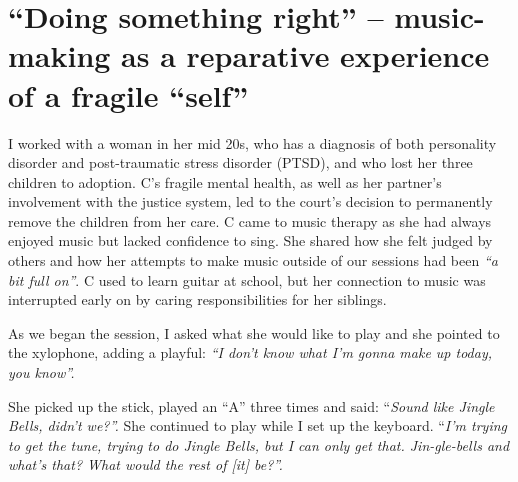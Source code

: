 \documentclass[authordate, empirical]{jote-new-article}
\begin{document}
\section{“Doing something right” -- music-making as a reparative experience of a fragile “self”}







I worked with a woman in her mid 20s, who has a diagnosis of both personality disorder and post-traumatic stress disorder (PTSD), and who lost her three children to adoption. C's fragile mental health, as well as her partner's involvement with the justice system, led to the court's decision to permanently remove the children from her care. C came to music therapy as she had always enjoyed music but lacked confidence to sing. She shared how she felt judged by others and how her attempts to make music outside of our sessions had been \emph{“a bit full on”}. C used to learn guitar at school, but her connection to music was interrupted early on by caring responsibilities for her siblings.







As we began the session, I asked what she would like to play and she pointed to the xylophone, adding a playful: \emph{“I don't know what I'm gonna make up today, you know”. }



She picked up the stick, played an “A” three times and said: “\emph{Sound like Jingle Bells, didn't we?”. }She continued to play while I set up the keyboard. “\emph{I'm trying to get the tune, trying to do Jingle Bells, but I can only get that. Jin-gle-bells and what's that? What would the rest of [it] be?”.}
\end{document}
